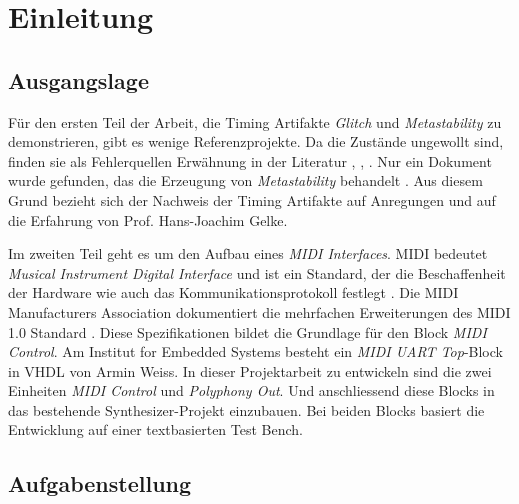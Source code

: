 
\chapter{Einleitung}\label{chap.einleitung}

\section{Ausgangslage}\label{sect.einleitung_ausgangslage}

Für den ersten Teil der Arbeit, die Timing Artifakte  \textit{Glitch} und \textit{Metastability} zu demonstrieren, gibt es wenige Referenzprojekte. Da die Zustände ungewollt sind, finden sie als Fehlerquellen Erwähnung in der Literatur \citep{ReferenceManual}, \citep{F_glitches}, \citep{F_metastability}. Nur ein Dokument wurde gefunden, das die Erzeugung von \textit{Metastability} behandelt \citep{Metastabil}. Aus diesem Grund bezieht sich der Nachweis der Timing Artifakte auf Anregungen und auf die Erfahrung von Prof. Hans-Joachim Gelke.

Im zweiten Teil geht es um den Aufbau eines \textit{MIDI Interfaces}. MIDI bedeutet \textit{Musical Instrument Digital Interface} und ist ein Standard, der die Beschaffenheit der Hardware wie auch das Kommunikationsprotokoll festlegt \citep{Midi_Braut}. Die MIDI Manufacturers Association dokumentiert die mehrfachen Erweiterungen des MIDI 1.0 Standard \citep{Midi_specification}. Diese Spezifikationen bildet die Grundlage für den Block \textit{MIDI Control}. Am Institut for Embedded Systems besteht ein \textit{MIDI UART Top}-Block in VHDL von Armin Weiss. In dieser Projektarbeit zu entwickeln sind die zwei Einheiten \textit{MIDI Control} und \textit{Polyphony Out}. Und anschliessend diese Blocks in das bestehende Synthesizer-Projekt einzubauen. Bei beiden Blocks basiert die Entwicklung auf einer textbasierten Test Bench.

\section{Aufgabenstellung}\label{sect.einleitung_ziele}

